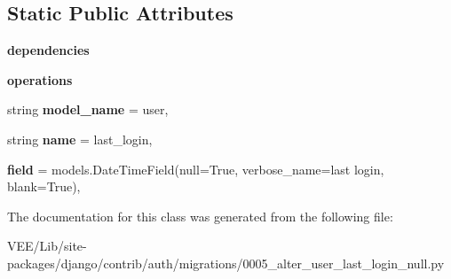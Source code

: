 \subsection*{Static Public Attributes}
\begin{DoxyCompactItemize}
\item 
\mbox{\label{classdjango_1_1contrib_1_1auth_1_1migrations_1_10005__alter__user__last__login__null_1_1_migration_a050eeb2d29d6fc9cfa1b7ca3db9bf651}} 
{\bfseries dependencies}
\item 
\mbox{\label{classdjango_1_1contrib_1_1auth_1_1migrations_1_10005__alter__user__last__login__null_1_1_migration_acdafd06fb52313e1148b671e13461038}} 
{\bfseries operations}
\item 
\mbox{\label{classdjango_1_1contrib_1_1auth_1_1migrations_1_10005__alter__user__last__login__null_1_1_migration_ab7e6362c82b46863b0d2c87c57c328d3}} 
string {\bfseries model\+\_\+name} = \textquotesingle{}user\textquotesingle{},
\item 
\mbox{\label{classdjango_1_1contrib_1_1auth_1_1migrations_1_10005__alter__user__last__login__null_1_1_migration_a7a4d0c92a7ca4227527132c1aa7e08a5}} 
string {\bfseries name} = \textquotesingle{}last\+\_\+login\textquotesingle{},
\item 
\mbox{\label{classdjango_1_1contrib_1_1auth_1_1migrations_1_10005__alter__user__last__login__null_1_1_migration_a1c53e64a756323e5476db5a10126cefb}} 
{\bfseries field} = models.\+Date\+Time\+Field(null=True, verbose\+\_\+name=\textquotesingle{}last login\textquotesingle{}, blank=True),
\end{DoxyCompactItemize}


The documentation for this class was generated from the following file\+:\begin{DoxyCompactItemize}
\item 
V\+E\+E/\+Lib/site-\/packages/django/contrib/auth/migrations/0005\+\_\+alter\+\_\+user\+\_\+last\+\_\+login\+\_\+null.\+py\end{DoxyCompactItemize}
